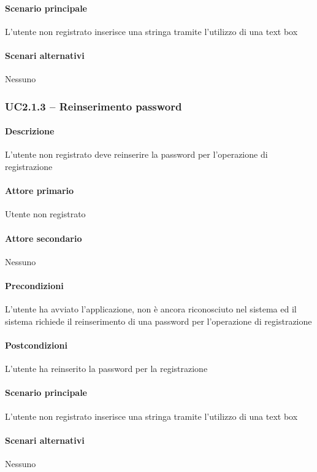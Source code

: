 \paragraph{Scenario principale}  
L’utente non registrato inserisce una stringa tramite l’utilizzo di una text box
\paragraph{Scenari alternativi}  Nessuno



\subsubsection{UC2.1.3 – Reinserimento password}
\paragraph{Descrizione}  L’utente non registrato deve reinserire la password per l’operazione di registrazione
\paragraph{Attore primario}  Utente non registrato
\paragraph{Attore secondario}  Nessuno
\paragraph{Precondizioni}  L’utente ha avviato l’applicazione, non è ancora riconosciuto nel sistema ed il sistema richiede il reinserimento di una password per l’operazione di registrazione
\paragraph{Postcondizioni}  L’utente ha reinserito la password per la registrazione
\paragraph{Scenario principale}  
L’utente non registrato inserisce una stringa tramite l’utilizzo di una text box
\paragraph{Scenari alternativi}  Nessuno




